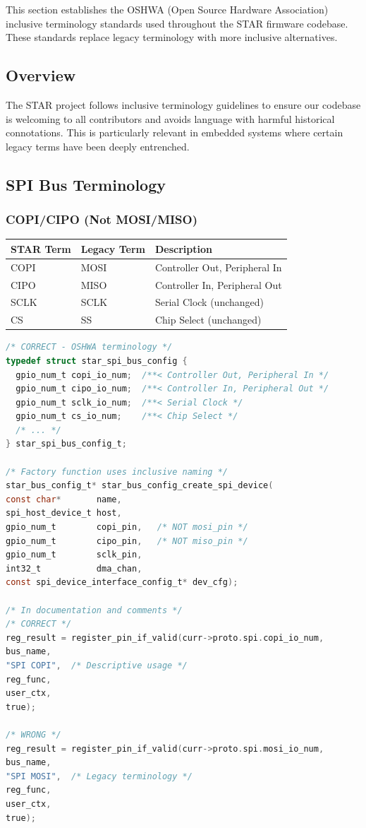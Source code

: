 This section establishes the OSHWA (Open Source Hardware Association) inclusive terminology standards used throughout the STAR firmware codebase. These standards replace legacy terminology with more inclusive alternatives.

\subsection{Overview}

The STAR project follows inclusive terminology guidelines to ensure our codebase is welcoming to all contributors and avoids language with harmful historical connotations. This is particularly relevant in embedded systems where certain legacy terms have been deeply entrenched.

\subsection{SPI Bus Terminology}

\subsubsection{COPI/CIPO (Not MOSI/MISO)}

\begin{center}
\begin{tabular}{|l|l|l|}
\hline
\textbf{STAR Term} & \textbf{Legacy Term} & \textbf{Description} \\
\hline
COPI & MOSI & Controller Out, Peripheral In \\
\hline
CIPO & MISO & Controller In, Peripheral Out \\
\hline
SCLK & SCLK & Serial Clock (unchanged) \\
\hline
CS & SS & Chip Select (unchanged) \\
\hline
\end{tabular}
\end{center}

\begin{lstlisting}[language=C]
/* CORRECT - OSHWA terminology */
typedef struct star_spi_bus_config {
  gpio_num_t copi_io_num;  /**< Controller Out, Peripheral In */
  gpio_num_t cipo_io_num;  /**< Controller In, Peripheral Out */
  gpio_num_t sclk_io_num;  /**< Serial Clock */
  gpio_num_t cs_io_num;    /**< Chip Select */
  /* ... */
} star_spi_bus_config_t;

/* Factory function uses inclusive naming */
star_bus_config_t* star_bus_config_create_spi_device(
const char*       name,
spi_host_device_t host,
gpio_num_t        copi_pin,   /* NOT mosi_pin */
gpio_num_t        cipo_pin,   /* NOT miso_pin */
gpio_num_t        sclk_pin,
int32_t           dma_chan,
const spi_device_interface_config_t* dev_cfg);

/* In documentation and comments */
/* CORRECT */
reg_result = register_pin_if_valid(curr->proto.spi.copi_io_num,
bus_name,
"SPI COPI",  /* Descriptive usage */
reg_func,
user_ctx,
true);

/* WRONG */
reg_result = register_pin_if_valid(curr->proto.spi.mosi_io_num,
bus_name,
"SPI MOSI",  /* Legacy terminology */
reg_func,
user_ctx,
true);
\end{lstlisting}

